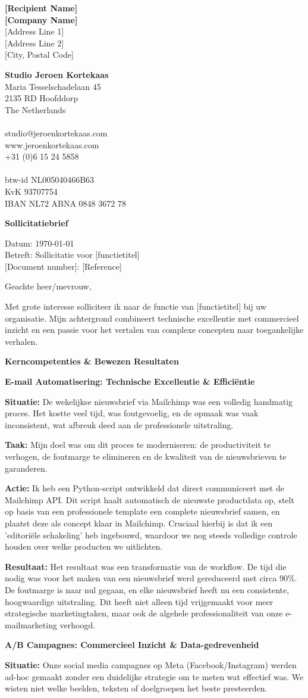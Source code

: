 \documentclass[11pt,a4paper]{article}
\makeatletter
\newcommand{\makeheader}{
    \begin{minipage}[t]{0.48\textwidth}
        \raggedright
        \textbf{{[Recipient Name]}}\\
        \textbf{{[Company Name]}}\\
        {[Address Line 1]}\\
        {[Address Line 2]}\\
        {[City, Postal Code]}
    \end{minipage}%
    \hfill%
    \begin{minipage}[t]{0.48\textwidth}
        \raggedleft
        \textbf{Studio Jeroen Kortekaas}\\
        Maria Tesselschadelaan 45\\
        2135 RD Hoofddorp\\
        The Netherlands\\
        \\
        studio@jeroenkortekaas.com\\
        www.jeroenkortekaas.com\\
        +31 (0)6 15 24 5858\\
        \\
        btw-id NL005040466B63\\
        KvK 93707754\\
        IBAN NL72 ABNA 0848 3672 78\\
        \mbox{}
    \end{minipage}

    \vspace{2em}
}
\newcommand{\doctitle}[1]{
    \vspace{1em}
    {\fontsize{24}{28}\selectfont\textbf{#1}}
    \vspace{1em}
}
\newcommand{\docinfo}[3]{
    Datum: #1\\
    Betreft: #2\\
    {[Document number]}: #3
    \vspace{1.5em}
}
\makeatother
\begin{document}
\makeheader

\doctitle{Sollicitatiebrief}

\docinfo{\today}{Sollicitatie voor {[functietitel]}}{{[Reference]}}

Geachte heer/mevrouw,

Met grote interesse solliciteer ik naar de functie van {[functietitel]} bij uw organisatie. Mijn achtergrond combineert technische excellentie met commercieel inzicht en een passie voor het vertalen van complexe concepten naar toegankelijke verhalen.

\textbf{Kerncompetenties \& Bewezen Resultaten}

\textbf{E-mail Automatisering: Technische Excellentie \& Efficiëntie}

\textbf{Situatie:} De wekelijkse nieuwsbrief via Mailchimp was een volledig handmatig proces. Het kostte veel tijd, was foutgevoelig, en de opmaak was vaak inconsistent, wat afbreuk deed aan de professionele uitstraling.

\textbf{Taak:} Mijn doel was om dit proces te moderniseren: de productiviteit te verhogen, de foutmarge te elimineren en de kwaliteit van de nieuwsbrieven te garanderen.

\textbf{Actie:} Ik heb een Python-script ontwikkeld dat direct communiceert met de Mailchimp API. Dit script haalt automatisch de nieuwste productdata op, stelt op basis van een professionele template een complete nieuwsbrief samen, en plaatst deze als concept klaar in Mailchimp. Cruciaal hierbij is dat ik een 'editoriële schakeling' heb ingebouwd, waardoor we nog steeds volledige controle houden over welke producten we uitlichten.

\textbf{Resultaat:} Het resultaat was een transformatie van de workflow. De tijd die nodig was voor het maken van een nieuwsbrief werd gereduceerd met circa 90\%. De foutmarge is naar nul gegaan, en elke nieuwsbrief heeft nu een consistente, hoogwaardige uitstraling. Dit heeft niet alleen tijd vrijgemaakt voor meer strategische marketingtaken, maar ook de algehele professionaliteit van onze e-mailmarketing verhoogd.

\vspace{1em}

\textbf{A/B Campagnes: Commercieel Inzicht \& Data-gedrevenheid}

\textbf{Situatie:} Onze social media campagnes op Meta (Facebook/Instagram) werden ad-hoc gemaakt zonder een duidelijke strategie om te meten wat effectief was. We wisten niet welke beelden, teksten of doelgroepen het beste presteerden.
\end{document}
